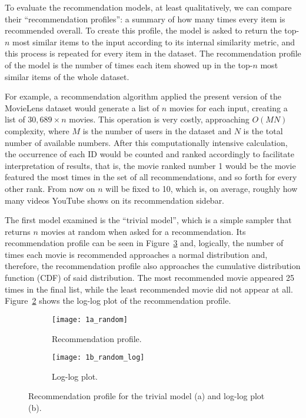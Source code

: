 
To evaluate the recommendation models, at least qualitatively, we can compare
their ``recommendation profiles'': a summary of how many times every item is
recommended overall. To create this profile, the model is asked to return the
top-$n$ most similar items to the input according to its internal similarity
metric, and this process is repeated for every item in the dataset. The
recommendation profile of the model is the number of times each item showed up
in the top-$n$ most similar items of the whole dataset.

For example, a recommendation algorithm applied the present version of the
MovieLens dataset would generate a list of $n$ movies for each input, creating a
list of $30,689 \times n$ movies. This operation is very costly, approaching
$O(MN)$ complexity, where $M$ is the number of users in the dataset and $N$ is
the total number of available numbers. After this computationally intensive
calculation, the occurrence of each ID would be counted and ranked accordingly
to facilitate interpretation of results, that is, the movie ranked number 1
would be the movie featured the most times in the set of all recommendations,
and so forth for every other rank. From now on $n$ will be fixed to 10, which
is, on average, roughly how many videos YouTube shows on its recommendation
sidebar.

The first model examined is the ``trivial model'', which is a simple sampler
that returns $n$ movies at random when asked for a recommendation. Its
recommendation profile can be seen in Figure~\ref{fig:fig1} and, logically, the
number of times each movie is recommended approaches a normal distribution and,
therefore, the recommendation profile also approaches the cumulative
distribution function (CDF) of said distribution. The most recommended movie
appeared 25 times in the final list, while the least recommended movie did not
appear at all. Figure~\ref{fig:fig1b} shows the log-log plot of the
recommendation profile.

\begin{figure}
  \centering
  \begin{subfigure}{0.45\textwidth}
    \centering
    \texttt{[image: 1a\_random]}
    \caption{Recommendation profile.\label{fig:fig1a}}
  \end{subfigure}
  \begin{subfigure}{0.45\textwidth}
    \centering
    \texttt{[image: 1b\_random\_log]}
    \caption{Log-log plot.\label{fig:fig1b}}
  \end{subfigure}
  \caption{Recommendation profile for the trivial model (a) and log-log plot
    (b).\label{fig:fig1}}
\end{figure}

